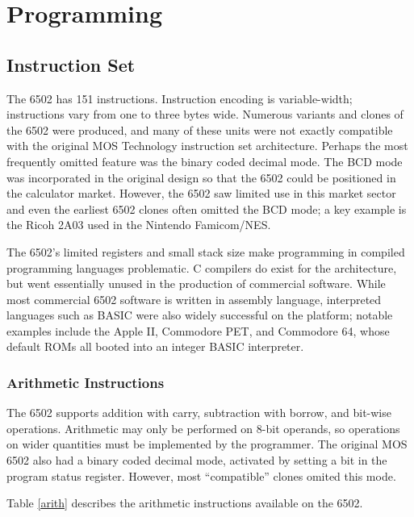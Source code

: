 \documentclass[journal]{IEEEtran}
\begin{document}
\section{Programming}

\subsection{Instruction Set}

The 6502 has 151 instructions. Instruction encoding is variable-width;
instructions vary from one to three bytes wide. Numerous variants and clones of
the 6502 were produced, and many of these units were not exactly compatible with
the original MOS Technology instruction set architecture. Perhaps the most
frequently omitted feature was the binary coded decimal mode. The BCD mode was
incorporated in the original design so that the 6502 could be positioned in the
calculator market. However, the 6502 saw limited use in this market sector and
even the earliest 6502 clones often omitted the BCD mode; a key example is the
Ricoh 2A03 used in the Nintendo Famicom/NES.

The 6502's limited registers and small stack size make programming in compiled
programming languages problematic. C compilers do exist for the architecture,
but went essentially unused in the production of commercial software. While most
commercial 6502 software is written in assembly language, interpreted languages
such as BASIC were also widely successful on the platform; notable examples
include the Apple II, Commodore PET, and Commodore 64, whose default ROMs all
booted into an integer BASIC interpreter.


\subsubsection{Arithmetic Instructions}

The 6502 supports addition with carry, subtraction with borrow, and bit-wise
operations. Arithmetic may only be performed on 8-bit operands, so operations on
wider quantities must be implemented by the programmer. The original MOS 6502
also had a binary coded decimal mode, activated by setting a bit in the program
status register. However, most ``compatible'' clones omited this mode.

Table \ref{arith} describes the arithmetic instructions available on the 6502.
\end{document}
